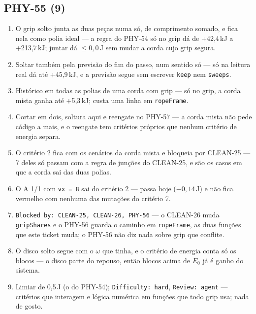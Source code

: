 \documentclass[11pt,a4paper]{article}
\begin{document}
{\subsection*{PHY-55 (9)}
\begin{enumerate}
  \item O grip solto junta as duas peças numa só, de comprimento somado, e
        fica nela como polia ideal --- a regra do PHY-54 só no grip dá de
        +42,4\,kJ a +213,7\,kJ; juntar dá $\leq 0{,}0$\,J sem mudar a corda
        cujo grip segura.
  \item Soltar também pela previsão do fim do passo, num sentido só --- só na
        leitura real dá até +45,9\,kJ, e a previsão segue sem escrever
        \texttt{keep} nem \texttt{sweeps}.
  \item Histórico em todas as polias de uma corda com grip --- só no grip, a
        corda mista ganha até +5,3\,kJ; custa uma linha em \texttt{ropeFrame}.
  \item Cortar em dois, soltura aqui e reengate no PHY-57 --- a corda mista
        não pede código a mais, e o reengate tem critérios próprios que nenhum
        critério de energia separa.
  \item O critério 2 fica com os cenários da corda mista e bloqueia por
        CLEAN-25 --- 7 deles só passam com a regra de junções do CLEAN-25, e
        são os casos em que a corda sai das duas polias.
  \item O A 1/1 com \texttt{vx = 8} sai do critério 2 --- passa hoje
        ($-0{,}14$\,J) e não fica vermelho com nenhuma das mutações do
        critério 7.
  \item \texttt{Blocked by: CLEAN-25, CLEAN-26, PHY-56} --- o CLEAN-26 muda
        \texttt{gripShares} e o PHY-56 guarda o caminho em \texttt{ropeFrame},
        as duas funções que este ticket muda; o PHY-56 não diz nada sobre grip
        que conflite.
  \item O disco solto segue com o $\omega$ que tinha, e o critério de energia
        conta só os blocos --- o disco parte do repouso, então blocos acima de
        $E_0$ já é ganho do sistema.
  \item Limiar de 0,5\,J (o do PHY-54); \texttt{Difficulty: hard},
        \texttt{Review: agent} --- critérios que interagem e lógica numérica em
        funções que todo grip usa; nada de gosto.
\end{enumerate}

}
\end{document}
